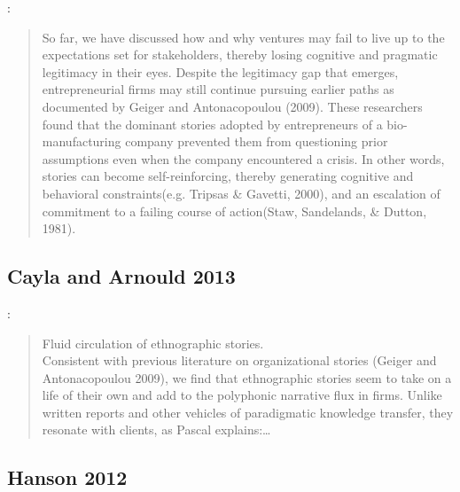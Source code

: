 \citep[p.17]{garud2014entrepreneurial}:
\begin{quote}
So  far,  we  have  discussed  how  and  why  ventures  may  fail  to  live  up  to  the  expectations  set  for stakeholders, thereby losing cognitive and pragmatic legitimacy in their eyes. Despite the legitimacy gap that emerges, entrepreneurial firms may still continue pursuing earlier paths as documented by Geiger and Antonacopoulou (2009). These researchers found that the dominant stories adopted by entrepreneurs of a bio-manufacturing company prevented them from questioning prior assumptions even when the company encountered a crisis. In other words, stories can become self-reinforcing, thereby generating cognitive and behavioral constraints(e.g. Tripsas \& Gavetti, 2000), and an escalation of commitment to a failing course of action(Staw, Sandelands, \& Dutton, 1981).
\begin{flushright}
\end{flushright}
\end{quote}

\subsection{Cayla and Arnould 2013}

\citep{cayla2013ethnographic}:
\begin{quote}
Fluid circulation of ethnographic stories.\\
Consistent with previous literature on organizational stories (Geiger and Antonacopoulou 2009), we find that ethnographic stories seem to take on a life of their own and add to the polyphonic narrative   flux   in   firms.   Unlike   written   reports   and   other vehicles of paradigmatic knowledge transfer, they resonate with clients, as Pascal explains:\ldots
\end{quote}

\subsection{Hanson 2012}


